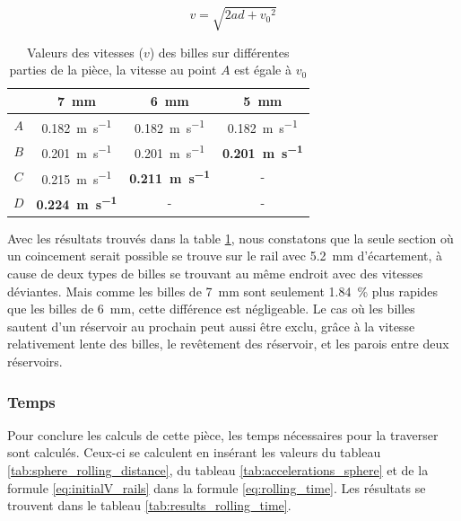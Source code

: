 \begin{equation}
    v=\sqrt{2ad +{v_{0}}^{2}}
    \label{eq:velocities_spheres}
\end{equation}

\begin{table}[htbp]
    \centering
    \begin{tabular}{|c|c|c|c|}
        \hline
         & \SI{7}{\mm} & \SI{6}{\mm} & \SI{5}{\mm} \\
        \hline
        $A$ & \SI{0.182}{\m\per\s} & \SI{0.182}{\m\per\s} & \SI{0.182}{\m\per\s} \\
        \hline
        $B$ & \SI{0.201}{\m\per\s} & \SI{0.201}{\m\per\s} & \textbf{\SI{0.201}{\m\per\s}} \\
        \hline
        $C$ & \SI{0.215}{\m\per\s} & \textbf{\SI{0.211}{\m\per\s}} & - \\
        \hline
        $D$ & \textbf{\SI{0.224}{\m\per\s}} & - & - \\
        \hline
    \end{tabular}
    \caption{Valeurs des vitesses ($v$) des billes sur différentes parties de la pièce, la vitesse au point $A$ est égale à $v_{0}$}
    \label{tab:sphere_velocities}
\end{table}

Avec les résultats trouvés dans la table \ref{tab:sphere_velocities}, nous constatons que la seule section où un coincement serait possible se trouve sur le rail avec \SI{5.2}{\mm} d'écartement, à cause de deux types de billes se trouvant au même endroit avec des vitesses déviantes. Mais comme les billes de \SI{7}{\mm} sont seulement \SI{1.84}{\percent} plus rapides que les billes de \SI{6}{\mm}, cette différence est négligeable. Le cas où les billes sautent d'un réservoir au prochain peut aussi être exclu, grâce à la vitesse relativement lente des billes, le revêtement des réservoir, et les parois entre deux réservoirs.

\subsubsection{Temps}

Pour conclure les calculs de cette pièce, les temps nécessaires pour la traverser sont calculés. Ceux-ci se calculent en insérant les valeurs du tableau \ref{tab:sphere_rolling_distance}, du tableau \ref{tab:accelerations_sphere} et de la formule \ref{eq:initialV_rails} dans la formule \ref{eq:rolling_time}. Les résultats se trouvent dans le tableau \ref{tab:results_rolling_time}.

